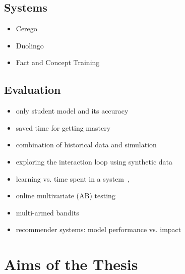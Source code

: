 \documentclass[table,color]{fithesis3/fithesis3}
\begin{document}
\section{Systems}

\begin{itemize}
	\item Cerego
	\item Duolingo~\cite{von2013duolingo, garcia2013learning}
	\item Fact and Concept Training~\cite{pavlik2007fact,pavlik2008using}
\end{itemize}

\section{Evaluation}

\begin{itemize}
	\item only student model and its accuracy~\cite{pelanek2014brief}
	\item saved time for getting mastery~\cite{yudelson2015small}
	\item combination of historical data and simulation~\cite{gonzalez2015your}
	\item exploring the interaction loop using synthetic data~\cite{niznan2015exploring}
	\item learning vs. time spent in a system~\cite{lomas2013optimizing, monterrat2015player},
	\item online multivariate (AB) testing~\cite{lomas2013optimizing,liu2014towards,stamper2012rise}
	\item multi-armed bandits~\cite{liu2014trading,lopes2015multi}
	\item recommender systems: model performance vs. impact~\cite{cremonesi2010performance}
\end{itemize}

\chapter{Aims of the Thesis}




\end{document}
